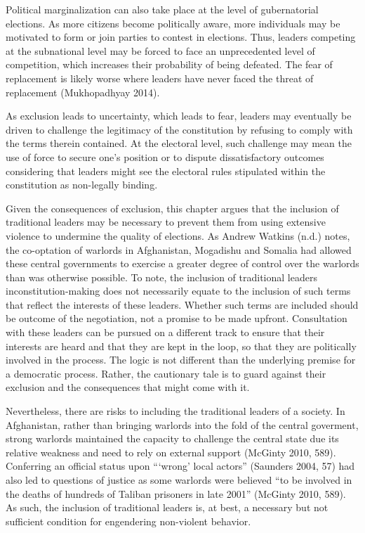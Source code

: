 \documentclass [11pt]{article}
\begin{document}
Political marginalization can also take place at the level of gubernatorial elections. As more citizens become politically aware, more individuals may be motivated to form or join parties to contest in elections. Thus, leaders competing at the subnational level may be forced to face an unprecedented level of competition, which increases their probability of being defeated. The fear of replacement is likely worse where leaders have never faced the threat of replacement (Mukhopadhyay 2014).

As exclusion leads to uncertainty, which leads to fear, leaders may eventually be driven to challenge the legitimacy of the constitution by refusing to comply with the terms therein contained. At the electoral level, such challenge may mean the use of force to secure one's position or to dispute dissatisfactory outcomes considering that leaders might see the electoral rules stipulated within the constitution as non-legally binding.

Given the consequences of exclusion, this chapter argues that the inclusion of traditional leaders may be necessary to prevent them from using extensive violence to undermine the quality of elections. As Andrew Watkins (n.d.) notes, the co-optation of warlords in Afghanistan, Mogadishu and Somalia had allowed these central governments to exercise a greater degree of control over the warlords than was otherwise possible. To note, the inclusion of traditional leaders inconstitution-making does not necessarily equate to the inclusion of such terms that reflect the interests of these leaders. Whether such terms are included should be outcome of the negotiation, not a promise to be made upfront. Consultation with these leaders can be pursued on a different track to ensure that their interests are heard and that they are kept in the loop, so that they are politically involved in the process. The logic is not different than the underlying premise for a democratic process. Rather, the cautionary tale is to guard against their exclusion and the consequences that might come with it.

Nevertheless, there are risks to including the traditional leaders of a society. In Afghanistan, rather than bringing warlords into the fold of the central goverment, strong warlords maintained the capacity to challenge the central state due its relative weakness and need to rely on external support (McGinty 2010, 589). Conferring an official status upon ```wrong' local actors'' (Saunders 2004, 57) had also led to questions of justice as some warlords were believed ``to be involved in the deaths of hundreds of Taliban prisoners in late 2001'' (McGinty 2010, 589). As such, the inclusion of traditional leaders is, at best, a necessary but not sufficient condition for engendering non-violent behavior.
\end{document}

